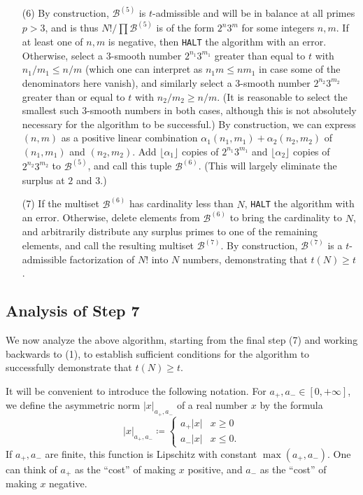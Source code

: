 \documentclass[12pt,a4paper,reqno]{amsart}
\numberwithin{equation}{section}
\theoremstyle{plain}
\theoremstyle{definition}
\newcommand\tuple{{\mathcal B}}
\begin{document}
\begin{enumerate}
\item[(6)] By construction, $\tuple^{(5)}$ is $t$-admissible and will be in balance at all primes $p>3$, and is thus $N!/\prod \tuple^{(5)}$ is of the form $2^n 3^m$ for some integers $n,m$.  If at least one of $n,m$ is negative, then \texttt{HALT} the algorithm with an error.  Otherwise, select a $3$-smooth number $2^{n_1} 3^{m_1}$ greater than equal to $t$ with $n_1/m_1 \leq n/m$ (which one can interpret as $n_1 m \leq nm_1$ in case some of the denominators here vanish), and similarly select a $3$-smooth number $2^{n_2} 3^{m_2}$ greater than or equal to $t$ with $n_2/m_2 \geq n/m$.  (It is reasonable to select the smallest such $3$-smooth numbers in both cases, although this is not absolutely necessary for the algorithm to be successful.) By construction, we can express $(n,m)$ as a positive linear combination $\alpha_1 (n_1,m_1) + \alpha_2 (n_2,m_2)$ of $(n_1,m_1)$ and $(n_2,m_2)$.  Add $\lfloor \alpha_1 \rfloor$ copies of $2^{n_1} 3^{m_1}$ and $\lfloor \alpha_2 \rfloor$ copies of $2^{n_2} 3^{m_2}$ to $\tuple^{(5)}$, and call this tuple $\tuple^{(6)}$.  (This will largely eliminate the surplus at $2$ and $3$.)
\item[(7)] If the multiset $\tuple^{(6)}$ has cardinality less than $N$, \texttt{HALT} the algorithm with an error.  Otherwise, delete elements from $\tuple^{(6)}$ to bring the cardinality to $N$, and arbitrarily distribute any surplus primes to one of the remaining elements, and call the resulting multiset $\tuple^{(7)}$.  By construction, $\tuple^{(7)}$ is a $t$-admissible factorization of $N!$ into $N$ numbers, demonstrating that $t(N) \geq t$.
\end{enumerate}

\subsection{Analysis of Step 7}

We now analyze the above algorithm, starting from the final step (7) and working backwards to (1), to establish sufficient conditions for the algorithm to successfully demonstrate that $t(N) \geq t$.

It will be convenient to introduce the following notation.
For $a_+,a_- \in [0,+\infty]$, we define the asymmetric norm $|x|_{a_+,a_-}$ of a real number $x$ by the formula
$$ 
|x|_{a_+,a_-} \coloneqq  \begin{cases} 
  a_+ |x| & x\geq 0 \\
  a_- |x| & x\leq 0.
\end{cases}
$$
If $a_+,a_-$ are finite, this function is Lipschitz with constant $\max(a_+,a_-)$.  One can think of $a_+$ as the ``cost'' of making $x$ positive, and $a_-$ as the
``cost'' of making $x$ negative.
\end{document}
